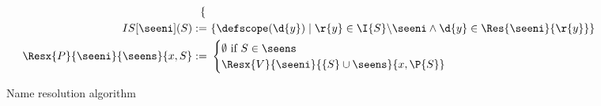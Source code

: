 \begin{figure*}[t]
\begin{boxedminipage}{\hsize}
\begin{minipage}{.6\linewidth}
\begin{align*}
\begin{cases}
    \end{cases} \\
    IS[\seeni](S) :=&\ \{ \defscope(\d{y}) \mid \r{y} \in \I{S} \backslash \seeni \wedge \d{y} \in \Res{\seeni}{\r{y}} \} \\
    \Resx{P}{\seeni}{\seens}{{x},S}
    :=&\ \begin{cases}
      \emptyset \mbox{ if } S \in \seens \\
      \Resx{V}{\seeni}{\{S\} \cup \seens}{{x},\P{S}}
    \end{cases} \\
  \end{align*}
  \end{minipage}
  \end{boxedminipage}
  \caption{Name resolution algorithm}
\end{figure*}